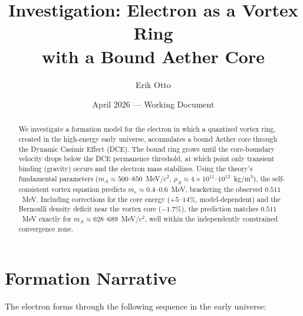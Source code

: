 \documentclass[12pt,letterpaper]{article}
\title{Investigation: Electron as a Vortex Ring\\
with a Bound Aether Core}
\author{Erik Otto}
\date{April 2026 --- Working Document}
\newcommand{\rhoa}{\rho_{\!A}}
\begin{document}
\maketitle

\begin{abstract}
We investigate a formation model for the electron in which a quantized
vortex ring, created in the high-energy early universe, accumulates a bound
Aether core through the Dynamic Casimir Effect (DCE).  The bound ring grows
until the core-boundary velocity drops below the DCE permanence threshold,
at which point only transient binding (gravity) occurs and the electron mass
stabilizes.  Using the theory's fundamental parameters ($m_A \approx
500$--$850$~MeV/$c^2$, $\rhoa \approx 4 \times 10^{11}$--$10^{12}$~kg/m$^3$),
the self-consistent vortex equation predicts $m_e \approx 0.4$--$0.6$~MeV,
bracketing the observed $0.511$~MeV.  Including corrections for the
core energy ($+5$--$14\%$, model-dependent) and the Bernoulli density
deficit near the vortex core ($-1.7\%$), the prediction matches $0.511$~MeV exactly for
$m_A \approx 628$--$689$~MeV/$c^2$, well within the independently
constrained convergence zone.
\end{abstract}


\section{Formation Narrative}
\label{sec:narrative}

The electron forms through the following sequence in the early universe:
\end{document}
